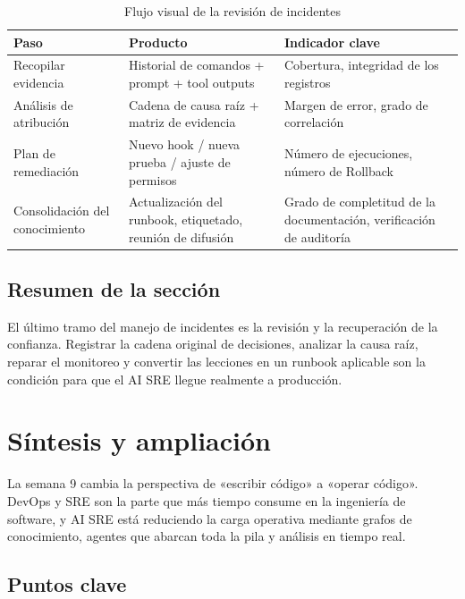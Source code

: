 \documentclass[a4paper]{article}
\begin{document}
\begin{table}[H]
\centering
\begin{tabular}{p{} p{} p{}}
\toprule
Paso & Producto & Indicador clave \\
\midrule
Recopilar evidencia & Historial de comandos + prompt + tool outputs & Cobertura, integridad de los registros \\
Análisis de atribución & Cadena de causa raíz + matriz de evidencia & Margen de error, grado de correlación \\
Plan de remediación & Nuevo hook / nueva prueba / ajuste de permisos & Número de ejecuciones, número de Rollback \\
Consolidación del conocimiento & Actualización del runbook, etiquetado, reunión de difusión & Grado de completitud de la documentación, verificación de auditoría \\
\bottomrule
\end{tabular}
\caption{Flujo visual de la revisión de incidentes}
\end{table}

\subsection{Resumen de la sección}

El último tramo del manejo de incidentes es la revisión y la recuperación de la confianza. Registrar la cadena original de decisiones, analizar la causa raíz, reparar el monitoreo y convertir las lecciones en un runbook aplicable son la condición para que el AI SRE llegue realmente a producción.
\section{Síntesis y ampliación}

La semana 9 cambia la perspectiva de «escribir código» a «operar código». DevOps y SRE son la parte que más tiempo consume en la ingeniería de software, y AI SRE está reduciendo la carga operativa mediante grafos de conocimiento, agentes que abarcan toda la pila y análisis en tiempo real.

\subsection{Puntos clave}
\end{document}
